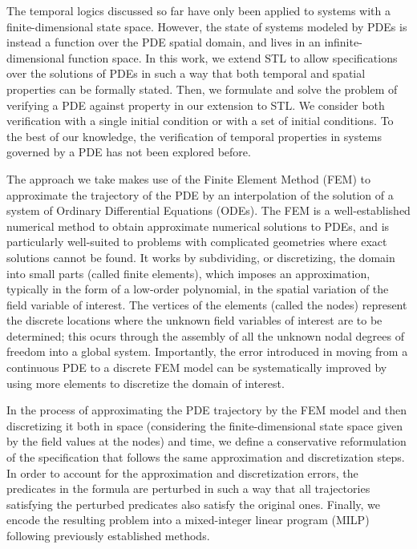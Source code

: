 \documentclass[letterpaper, 10 pt, conference]{ieeeconf/ieeeconf}
\begin{document}
The temporal logics discussed so far have only been applied to systems with a
finite-dimensional state space. However, the state of systems modeled by
PDEs is instead a function over the PDE spatial domain, and lives in an
infinite-dimensional function space. In this work, we extend STL to allow
specifications over the solutions of PDEs in such a way that both temporal and
spatial properties can be formally stated. Then, we formulate and solve the problem 
of verifying a PDE against property in our extension to STL. We consider both verification
with a single initial condition or with a set of initial conditions.
To the best of our knowledge, the verification 
of temporal properties in systems governed by a PDE has not been explored before.


The approach we take makes use of the Finite Element Method (FEM) to
approximate the trajectory of the PDE by an interpolation of the solution of a
system of Ordinary Differential Equations (ODEs). The FEM is a well-established
numerical method to obtain approximate numerical solutions to PDEs, and is particularly
well-suited to problems with complicated
geometries where exact solutions cannot be found. It works by subdividing, or
discretizing, the domain into small parts (called finite elements), which
imposes an approximation, typically in the form of a low-order polynomial, in
the spatial variation of the field variable of interest. The vertices of the
elements (called the nodes) represent the discrete locations where the unknown
field variables of interest are to be determined; this ocurs through the
assembly of all the unknown nodal degrees of freedom into a global system.
Importantly, the error introduced in moving from a continuous PDE to a discrete
FEM model can be systematically improved by using more elements to discretize
the domain of interest.

In the process of approximating the PDE trajectory by the FEM model and then
discretizing it both in space (considering the finite-dimensional state space
given by the field values at the nodes) and time, we define a conservative
reformulation of the specification that follows the same approximation and
discretization steps. In order to account for the approximation and
discretization errors, the predicates in the formula are perturbed in such a way
that all trajectories satisfying the perturbed predicates also satisfy the
original ones. Finally, we encode the resulting problem into a mixed-integer
linear program (MILP) following previously established methods.
\end{document}
